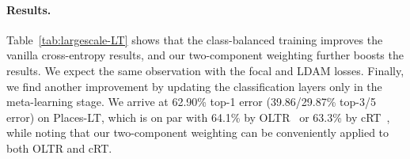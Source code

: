 \paragraph{Results.}
Table~\ref{tab:largescale-LT} shows that the class-balanced training improves the vanilla cross-entropy results, and our two-component weighting further boosts the results. We expect the same observation with the focal and LDAM losses. Finally, we find another improvement by updating the classification layers only in the meta-learning stage. We arrive at 62.90\% top-1 error (39.86/29.87\% top-3/5 error) on Places-LT, which is on par with 64.1\% by OLTR~\cite{OLTR} or 63.3\% by cRT~\cite{kang2019decoupling}, while noting that our two-component weighting can be conveniently applied to both OLTR and cRT. 



















































